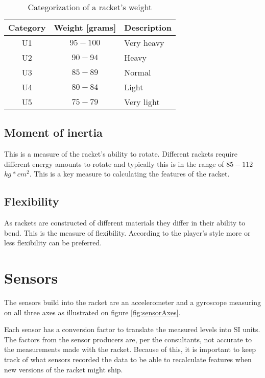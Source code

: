 \begin{table}
	\begin{center}
		\begin{tabularx}{0.7\textwidth}{C|C|L}
			\textbf{Category} & \textbf{Weight [grams]} & \textbf{Description} \\
			\hline
			U1                & $95-100$                  & Very heavy           \\
			U2                & $90-94$                   & Heavy                \\
			U3                & $85-89$                   & Normal               \\
			U4                & $80-84$                   & Light                \\
			U5                & $75-79$                   & Very light           \\
		\end{tabularx}
	\end{center}
    \caption{Categorization of a racket's weight}
    \label{tab:racket:weight}
\end{table}

\subsection*{Moment of inertia}
This is a measure of the racket's ability to rotate.
Different rackets require different energy amounts to rotate and typically this is in the range of $85-112$ \(kg*cm^2\).
This is a key measure to calculating the features of the racket.

\subsection*{Flexibility}
As rackets are constructed of different materials they differ in their ability to bend.
This is the measure of flexibility.
According to the player's style more or less flexibility can be preferred.

\section{Sensors}
The sensors build into the racket are an accelerometer and a gyroscope measuring on all three axes as illustrated on figure \ref{fig:sensorAxes}.

Each sensor has a conversion factor to translate the measured levels into SI units.
The factors from the sensor producers are, per the consultants, not accurate to the measurements made with the racket.
Because of this, it is important to keep track of what sensors recorded the data to be able to recalculate features when new versions of the racket might ship.

